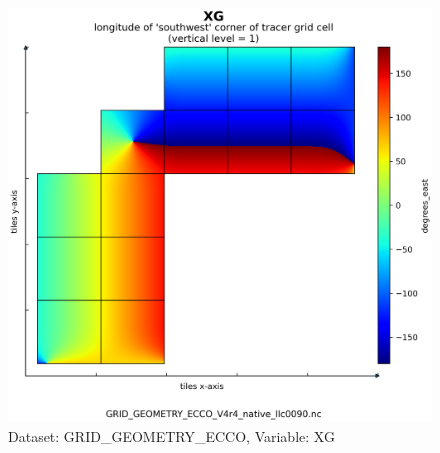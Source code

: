 \begin{figure}[H]
\centering
\includegraphics[scale=0.55]{../images/plots/native_plots_coords/Geometry_Parameters_for_the_Lat-Lon-Cap_90_(llc90)_Native_Model_Grid_(Version_4_Release_4)/XG.png}
\caption{Dataset: GRID\_GEOMETRY\_ECCO, Variable: XG}
\label{tab:table-GRID_GEOMETRY_ECCO_XG-Plot}
\end{figure}
\newpage
\pagebreak

